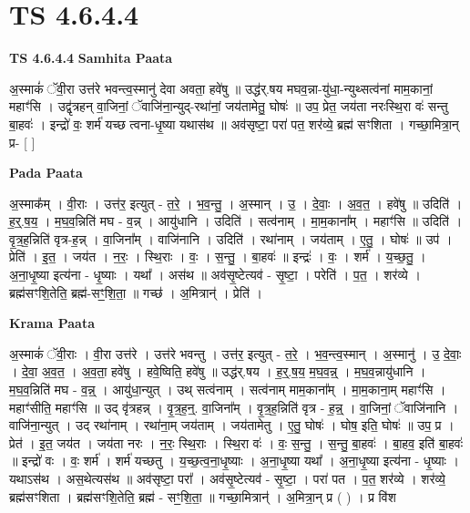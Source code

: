 \documentclass[17pt]{extarticle}
\begin{document}
\section{ TS 4.6.4.4 }

\textbf{TS 4.6.4.4 } \newline
\textbf{Samhita Paata} \newline

अ॒स्माकं॑ ॅवी॒रा उत्त॑रे भवन्त्व॒स्मानु॑ देवा अवता॒ हवे॑षु ॥ उद्ध॑र्.षय मघव॒न्ना-यु॑धा॒-न्युथ्सत्व॑नां माम॒कानां॒ महाꣳ॑सि । उद्वृ॑त्रहन् वा॒जिनां॒ ॅवाजि॑ना॒न्युद्-रथा॑नां॒ जय॑तामेतु॒ घोषः॑ ॥ उप॒ प्रेत॒ जय॑ता नरःस्थि॒रा वः॑ सन्तु बा॒हवः॑ । इन्द्रो॑ वः॒ शर्म॑ यच्छ त्वना-धृ॒ष्या यथास॑थ ॥ अव॑सृष्टा॒ परा॑ पत॒ शर॑व्ये॒ ब्रह्म॑ सꣳशिता । गच्छा॒मित्रा॒न् प्र- [  ] \newline

\textbf{Pada Paata} \newline

अ॒स्माक᳚म् । वी॒राः । उत्त॑र॒ इत्युत् - त॒रे॒ । भ॒व॒न्तु॒ । अ॒स्मान् । उ॒ । दे॒वाः॒ । अ॒व॒त॒ । हवे॑षु ॥ उदिति॑ । ह॒र्॒.ष॒य॒ । म॒घ॒व॒न्निति॑ मघ - व॒न्न् । आयु॑धानि । उदिति॑ । सत्व॑नाम् । मा॒म॒काना᳚म् । महाꣳ॑सि ॥ उदिति॑ । वृ॒त्र॒ह॒न्निति॑ वृत्र-ह॒न्न् । वा॒जिना᳚म् । वाजि॑नानि । उदिति॑ । रथा॑नाम् । जय॑ताम् । ए॒तु॒ । घोषः॑ ॥ उप॑ । प्रेति॑ । इ॒त॒ । जय॑त । न॒रः॒ । स्थि॒राः । वः॒ । स॒न्तु॒ । बा॒हवः॑ ॥ इन्द्रः॑ । वः॒ । शर्म॑ । य॒च्छ॒तु॒ । अ॒ना॒धृ॒ष्या इत्य॑ना - धृ॒ष्याः । यथा᳚ । अस॑थ ॥ अव॑सृ॒ष्टेत्यव॑ - सृ॒ष्टा॒ । परेति॑ । प॒त॒ । शर॑व्ये । ब्रह्म॑सꣳशि॒तेति॒ ब्रह्म॑-सꣳ॒॒शि॒ता॒ ॥ गच्छ॑ । अ॒मित्रान्॑ । प्रेति॑ ।  \newline


\textbf{Krama Paata} \newline

अ॒स्माकं॑ ॅवी॒राः । वी॒रा उत्त॑रे । उत्त॑रे भवन्तु । उत्त॑र॒ इत्युत् - त॒रे॒ । भ॒व॒न्त्व॒स्मान् । अ॒स्मानु॑ । उ॒ दे॒वाः॒ । दे॒वा॒ अ॒व॒त॒ । अ॒व॒ता॒ हवे॑षु । हवे॒ष्विति॒ हवे॑षु ॥ उद्ध॑र्.षय । ह॒र्॒.ष॒य॒ म॒घ॒व॒न्न्॒ । म॒घ॒व॒न्नायु॑धानि । म॒घ॒व॒न्निति॑ मघ - व॒न्न्॒ । आयु॑धा॒न्युत् । उथ् सत्व॑नाम् । सत्व॑नाम् माम॒काना᳚म् । मा॒म॒काना॒म् महाꣳ॑सि । महाꣳ॑सीति॒ महाꣳ॑सि ॥ उद् वृ॑त्रहन्न् । वृ॒त्र॒ह॒न्॒. वा॒जिना᳚म् । वृ॒त्र॒ह॒न्निति॑ वृत्र - ह॒न्न्॒ । वा॒जिनां॒ ॅवाजि॑नानि । वाजि॑ना॒न्युत् । उद् रथा॑नाम् । रथा॑ना॒म् जय॑ताम् । जय॑तामेतु । ए॒तु॒ घोषः॑ । घोष॒ इति॒ घोषः॑ ॥ उप॒ प्र । प्रेत॑ । इ॒त॒ जय॑त । जय॑ता नरः । न॒रः॒ स्थि॒राः । स्थि॒रा वः॑ । वः॒ स॒न्तु॒ । स॒न्तु॒ बा॒हवः॑ । बा॒हव॒ इति॑ बा॒हवः॑ ॥ इन्द्रो॑ वः । वः॒ शर्म॑ । शर्म॑ यच्छतु । य॒च्छ॒त्व॒ना॒धृ॒ष्याः । अ॒ना॒धृ॒ष्या यथा᳚ । अ॒ना॒धृ॒ष्या इत्य॑ना - धृ॒ष्याः । यथाऽस॑थ । अस॒थेत्यस॑थ ॥ अव॑सृष्टा॒ परा᳚ । अव॑सृ॒ष्टेत्यव॑ - सृ॒ष्टा॒ । परा॑ पत । प॒त॒ शर॑व्ये । शर॑व्ये॒ ब्रह्म॑सꣳशिता । ब्रह्म॑सꣳशि॒तेति॒ ब्रह्म॑ - सꣳ॒॒शि॒ता॒ ॥ गच्छा॒मित्रान्॑ । अ॒मित्रा॒न् प्र ( ) । प्र वि॑श \newline
\end{document}
